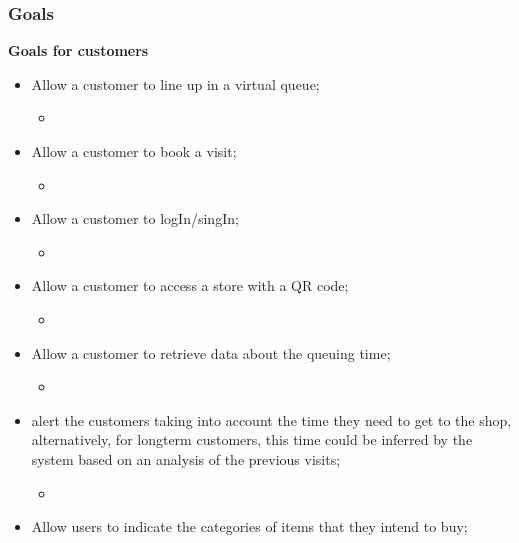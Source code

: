 \subsubsection{Goals}
\textbf{Goals for customers}
\begin{itemize}
    \item Allow a customer to line up in a virtual queue;
        \begin{itemize}
            \item 
        \end{itemize}
    \item Allow a customer to book a visit;
        \begin{itemize}
            \item 
        \end{itemize} 
    \item Allow a customer to logIn/singIn;
        \begin{itemize}
            \item 
        \end{itemize}
    \item Allow a customer to access a store with a QR code;
        \begin{itemize}
            \item 
        \end{itemize}
    \item Allow a customer to retrieve data about the queuing time;
        \begin{itemize}
            \item 
        \end{itemize}
    \item alert the customers taking into account the time they need to get to the shop, alternatively, for longterm customers, this time could be inferred by the system based on an analysis of the previous visits;
        \begin{itemize}
            \item 
        \end{itemize}
    \item Allow users to indicate the categories of items that they intend to buy;
\end{itemize}


